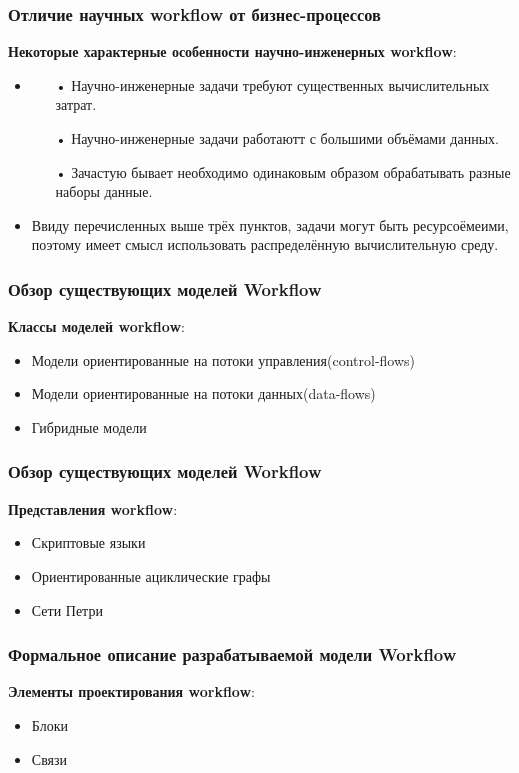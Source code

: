 \documentclass[10pt,pdf,hyperref={unicode}]{beamer}
\begin{document}
\begin{frame}
\frametitle{Отличие научных workflow от бизнес-процессов}
 \textbf{ Некоторые характерные особенности научно-инженерных workflow}:
\begin{itemize}
\item<1-> 
\begin{enumerate}
\item[•] Научно-инженерные задачи требуют существенных вычислительных затрат.
\item[•] Научно-инженерные задачи работаютт с большими объёмами данных.
\item[•] Зачастую бывает  необходимо одинаковым образом обрабатывать разные наборы данные.
\end{enumerate}
\item<2-> Ввиду перечисленных выше трёх пунктов, задачи могут быть ресурсоёмеими, поэтому имеет смысл использовать распределённую вычислительную среду.
\end{itemize}
\end{frame}


\begin{frame}
\frametitle{Обзор существующих моделей Workflow}

\textbf{Классы моделей workflow}:
\begin{itemize}
\item<1-> Модели ориентированные на потоки управления(control-flows)
\item<2-> Модели ориентированные на потоки данных(data-flows)
\item<3-> Гибридные модели
\end{itemize}

\end{frame}

\begin{frame}
\frametitle{Обзор существующих моделей Workflow}

\textbf{Представления workflow}:
\begin{itemize}
\item<1-> Скриптовые языки
\item<2-> Ориентированные ациклические графы
\item<3-> Сети Петри
\end{itemize}

\end{frame}


\begin{frame}
\frametitle{Формальное описание разрабатываемой модели Workflow}

\textbf{Элементы проектирования workflow}:
\begin{itemize}
\item<1-> Блоки
\item<1-> Связи
\end{itemize}

\end{frame}
\end{document}

